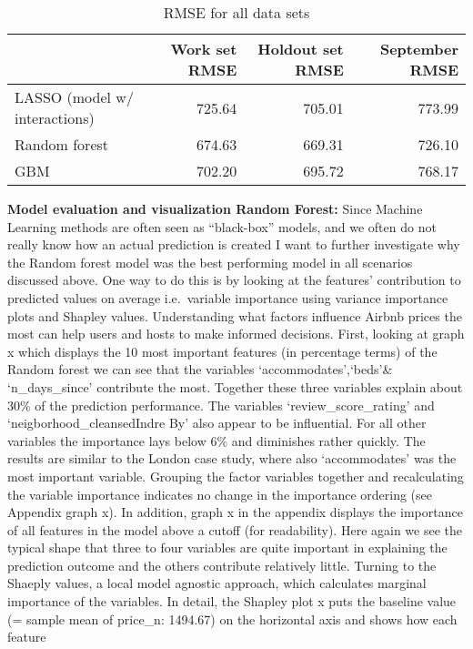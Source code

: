 \documentclass[
]{article}
\begin{document}
\begin{table}

\caption{\label{tab:unnamed-chunk-22}RMSE for all data sets}
\centering
\begin{tabular}[t]{l|r|r|r}
\hline
  & Work set RMSE & Holdout set RMSE & September RMSE\\
\hline
LASSO (model w/ interactions) & 725.64 & 705.01 & 773.99\\
\hline
Random forest & 674.63 & 669.31 & 726.10\\
\hline
GBM & 702.20 & 695.72 & 768.17\\
\hline
\end{tabular}
\end{table}

\textbf{Model evaluation and visualization Random Forest:} Since Machine
Learning methods are often seen as ``black-box'' models, and we often do
not really know how an actual prediction is created I want to further
investigate why the Random forest model was the best performing model in
all scenarios discussed above. One way to do this is by looking at the
features' contribution to predicted values on average i.e.~variable
importance using variance importance plots and Shapley values.
Understanding what factors influence Airbnb prices the most can help
users and hosts to make informed decisions. First, looking at graph x
which displays the 10 most important features (in percentage terms) of
the Random forest we can see that the variables `accommodates',`beds'\&
`n\_days\_since' contribute the most. Together these three variables
explain about 30\% of the prediction performance. The variables
`review\_score\_rating' and `neigborhood\_cleansedIndre By' also appear
to be influential. For all other variables the importance lays below 6\%
and diminishes rather quickly. The results are similar to the London
case study, where also `accommodates' was the most important variable.
Grouping the factor variables together and recalculating the variable
importance indicates no change in the importance ordering (see Appendix
graph x). In addition, graph x in the appendix displays the importance
of all features in the model above a cutoff (for readability). Here
again we see the typical shape that three to four variables are quite
important in explaining the prediction outcome and the others contribute
relatively little. Turning to the Shaeply values, a local model agnostic
approach, which calculates marginal importance of the variables. In
detail, the Shapley plot x puts the baseline value (= sample mean of
price\_n: 1494.67) on the horizontal axis and shows how each feature
\end{document}
